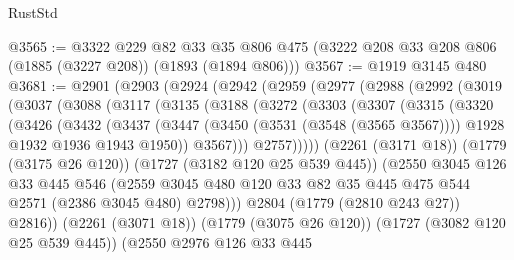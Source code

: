 \begin{lexlean}{RustStd}
\begin{coremodule}
@3565 := @3322
    @229
    @82
    @33
    @35
    @806
    @475
    (@3222 @208 @33 @208 @806 (@1885 (@3227 @208)) (@1893 (@1894 @806)))
@3567 := @1919 @3145 @480
@3681 := @2901
    (@2903
      (@2924
        (@2942
          (@2959
            (@2977
              (@2988
                (@2992
                  (@3019
                    (@3037
                      (@3088
                        (@3117
                          (@3135
                            (@3188
                              (@3272
                                (@3303
                                  (@3307
                                    (@3315
                                      (@3320
                                        (@3426
                                          (@3432
                                            (@3437
                                              (@3447
                                                (@3450 (@3531 (@3548 (@3565 @3567))))
                                                @1928
                                                @1932
                                                @1936
                                                @1943
                                                @1950))
                                            @3567)))
                                      @2757)))))
                            (@2261 (@3171 @18))
                            (@1779 (@3175 @26 @120))
                            (@1727 (@3182 @120 @25 @539 @445))
                            (@2550
                              @3045
                              @126
                              @33
                              @445
                              @546
                              (@2559
                                @3045
                                @480
                                @120
                                @33
                                @82
                                @35
                                @445
                                @475
                                @544
                                @2571
                                (@2386 @3045 @480)
                                @2798)))
                          @2804
                          (@1779 (@2810 @243 @27))
                          @2816))
                      (@2261 (@3071 @18))
                      (@1779 (@3075 @26 @120))
                      (@1727 (@3082 @120 @25 @539 @445))
                      (@2550
                        @2976
                        @126
                        @33
                        @445

\end{coremodule}
\end{lexlean}
